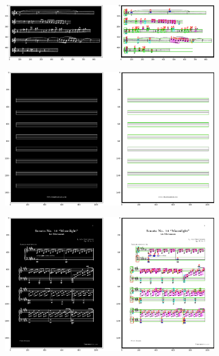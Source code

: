 \documentclass[12pt]{article}
\begin{document}
\begin{enumerate}
\begin{figure}[h!]
\begin{subfigure}[b]{0.48\linewidth}
				\end{subfigure}
				\begin{subfigure}[b]{0.48\linewidth}
					\includegraphics[width=\linewidth]{Eazy/Zdj21.png}
				\end{subfigure}
				\begin{subfigure}[b]{0.48\linewidth}
					\includegraphics[width=\linewidth]{Eazy/Zdj22.png}
				\end{subfigure}
				\begin{subfigure}[b]{0.48\linewidth}
					\includegraphics[width=\linewidth]{Eazy/Zdj23.png}
				\end{subfigure}

\end{figure}
\end{enumerate}
\end{document}
